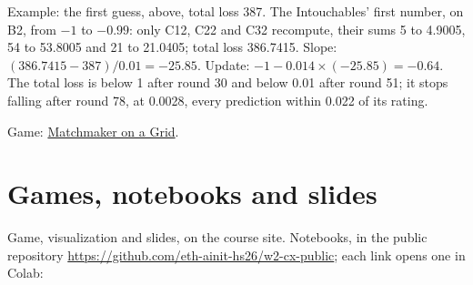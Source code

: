 \documentclass[11pt,a4paper]{article}
\newcommand{\Grid}{\href{https://eth-ainit-hs26.github.io/AINIT-PAGE/viz/we2/matchmaker-grid/}{Matchmaker on a Grid}}
\begin{document}
Example: the first guess, above, total loss 387. The Intouchables' first number, on B2, from $-1$ to $-0.99$: only
C12, C22 and C32 recompute, their sums 5 to 4.9005, 54 to 53.8005 and 21 to 21.0405; total loss 386.7415. Slope: $(386.7415 - 387)/0.01 = -25.85$. Update: $-1 - 0.014 \times (-25.85) = -0.64$. The
total loss is below 1 after round 30 and below 0.01 after round 51; it stops falling after round 78, at 0.0028, every
prediction within 0.022 of its rating.

Game: \Grid.

\section{Games, notebooks and slides}

{\raggedright Game, visualization and slides, on the course site. Notebooks, in the public repository
\mbox{\url{https://github.com/eth-ainit-hs26/w2-cx-public}}; each link opens one in Colab:\par}
\end{document}
